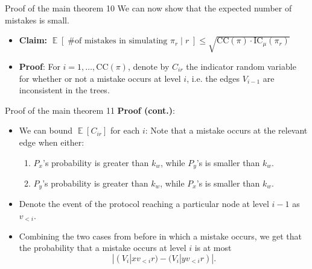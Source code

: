 \documentclass[10pt]{beamer}
\newcommand\E{\mathop{\mathbb{E}}}
\newcommand\CC{\textrm{CC}}
\newcommand\IC{\textrm{IC}}
\begin{document}
\begin{frame}{Proof of the main theorem 10}
We can now show that the expected number of mistakes is small.
\begin{itemize}
    \item \textbf{Claim:}
    $\E[\;\textrm{\# of mistakes in simulating $\pi_r$} \;|\; r\;]  \leq \sqrt{\CC(\pi) \cdot \IC_\mu(\pi_r)}$
    \vskip 0.2cm
    \item \textbf{Proof}: For $i = 1, \ldots, \CC(\pi)$, denote by $C_{ir}$ the indicator random variable for whether or not a mistake occurs at level $i$, i.e. the edges $V_{i-1}$ are inconsistent in the trees.
\end{itemize}
\end{frame}

\begin{frame}{Proof of the main theorem 11}
\textbf{Proof (cont.)}:
\begin{itemize}
    \item We can bound $\E[C_{ir}]$ for each $i$: Note that a mistake occurs at the relevant edge when either:
    \vskip 0.1cm
    \begin{enumerate}
        \item $P_x$'s probability is greater than $k_w$, while $P_y$'s is smaller than $k_w$.
        \vskip 0.1cm
        \item $P_y$'s probability is greater than $k_w$, while $P_x$'s is smaller than $k_w$.
    \end{enumerate}
    \pause
    \vskip 0.2cm
    \item Denote the event of the protocol reaching a particular node at level $i-1$ as $v_{<i}$. 
    \vskip 0.2cm
    \pause
    \item Combining the two cases from before in which a mistake occurs, we get that the probability that a mistake occurs at level $i$ is at most $$|(V_i | xv_{<i}r) - (V_i | yv_{<i}r)|.$$
\end{itemize}
\end{frame}
\end{document}
